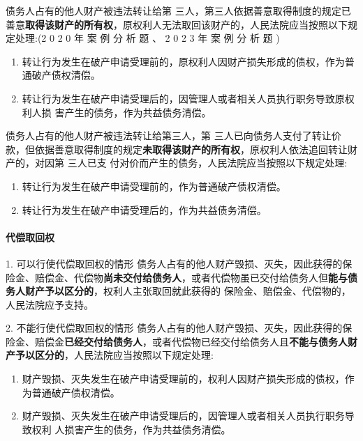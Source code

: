 \documentclass[UTF8,12pt]{ctexart}
\numberwithin{equation}{section} %
\numberwithin{figure}{section}
\numberwithin{table}{section}
\begin{document}
	债务人占有的他人财产被违法转让给第 三人，第三人依据善意取得制度的规定已善意\textbf{取得该财产的所有权}，原权利人无法取回该财产的，人民法院应当按照以下规定处理:(2 0 2 0 年 案 例 分 析 题 、 2 0 2 3 年 案 例 分 析 题 ) 
	\begin{enumerate}
		\item 转让行为发生在破产申请受理前的，原权利人因财产损失形成的债权，作为普通破产债权清偿。
		
		\item 转让行为发生在破产申请受理后的，因管理人或者相关人员执行职务导致原权利人损 害产生的债务，作为共益债务清偿。
	\end{enumerate}
	
	债务人占有的他人财产被违法转让给第三人，第 三人已向债务人支付了转让价款，但依据善意取得制度的规定\textbf{未取得该财产的所有权}，原权利人依法追回转让财产的，对因第 三人已支 付对价而产生的债务，人民法院应当按照以下规定处理:
	\begin{enumerate}
		\item 转让行为发生在破产申请受理前的，作为普通破产债权清偿。
		
		\item 转让行为发生在破产申请受理后的，作为共益债务清偿。
	\end{enumerate}
	
	
	\paragraph{代偿取回权}
	1. 可以行使代偿取回权的情形 
	债务人占有的他人财产毁损、灭失，因此获得的保险金、赔偿金、代偿物\textbf{尚未交付给债务人}，或者代偿物虽已交付给债务人但\textbf{能与债务人财产予以区分的}，权利人主张取回就此获得的 保险金、赔偿金、代偿物的，人民法院应予支持。
	
	2. 不能行使代偿取回权的情形 
	债务人占有的他人财产毁损、灭失，因此获得的保险金、赔偿金\textbf{已经交付给债务人}，或者代偿物已经交付给债务人且\textbf{不能与债务人财产予以区分的}，人民法院应当按照以下规定处理: 
	\begin{enumerate}
		\item 财产毁损、灭失发生在破产申请受理前的，权利人因财产损失形成的债权，作为普通破产债权清偿。
		
		\item 财产毁损、灭失发生在破产申请受理后的，因管理人或者相关人员执行职务导致权利 人损害产生的债务，作为共益债务清偿。
	\end{enumerate}
	
	
\end{document}
